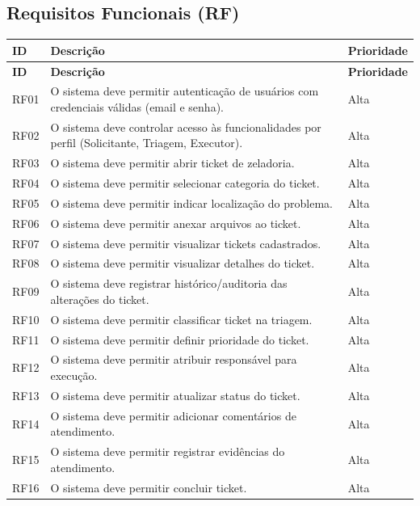 \documentclass[12pt,a4paper]{article}
\begin{document}
\subsection{Requisitos Funcionais (RF)}

\begin{longtable}{|>{\raggedright\arraybackslash}p{1.6cm}|>{\raggedright\arraybackslash}p{9.8cm}|>{\raggedright\arraybackslash}p{2.3cm}|}
\hline
\textbf{ID} & \textbf{Descrição} & \textbf{Prioridade} \\ \hline
\endfirsthead
\hline
\textbf{ID} & \textbf{Descrição} & \textbf{Prioridade} \\ \hline
\endhead

RF01 & O sistema deve permitir autenticação de usuários com credenciais válidas (email e senha). & Alta \\ \hline
RF02 & O sistema deve controlar acesso às funcionalidades por perfil (Solicitante, Triagem, Executor). & Alta \\ \hline
RF03 & O sistema deve permitir abrir ticket de zeladoria. & Alta \\ \hline
RF04 & O sistema deve permitir selecionar categoria do ticket. & Alta \\ \hline
RF05 & O sistema deve permitir indicar localização do problema. & Alta \\ \hline
RF06 & O sistema deve permitir anexar arquivos ao ticket. & Alta \\ \hline
RF07 & O sistema deve permitir visualizar tickets cadastrados. & Alta \\ \hline
RF08 & O sistema deve permitir visualizar detalhes do ticket. & Alta \\ \hline
RF09 & O sistema deve registrar histórico/auditoria das alterações do ticket. & Alta \\ \hline
RF10 & O sistema deve permitir classificar ticket na triagem. & Alta \\ \hline
RF11 & O sistema deve permitir definir prioridade do ticket. & Alta \\ \hline
RF12 & O sistema deve permitir atribuir responsável para execução. & Alta \\ \hline
RF13 & O sistema deve permitir atualizar status do ticket. & Alta \\ \hline
RF14 & O sistema deve permitir adicionar comentários de atendimento. & Alta \\ \hline
RF15 & O sistema deve permitir registrar evidências do atendimento. & Alta \\ \hline
RF16 & O sistema deve permitir concluir ticket. & Alta \\ \hline

\end{longtable}
\end{document}
